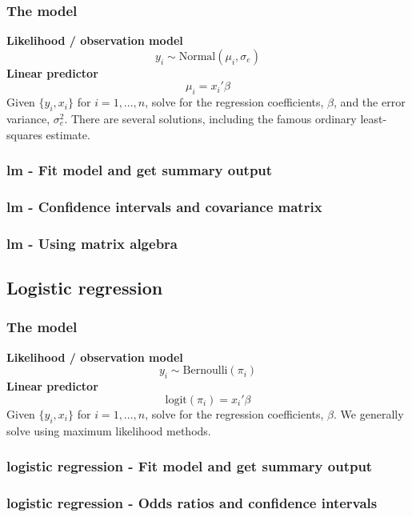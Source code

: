 \documentclass{beamer}
\begin{document}
\begin{frame}
    \frametitle{The model}
    \textbf{Likelihood / observation model}
    \[y_i \sim \text{Normal}(\mu_i, \sigma_e)\]
    \textbf{Linear predictor}
    \[\mu_i = x_i' \beta\]
    \bigskip
    Given $\{y_i, x_i\}$ for $i=1,...,n$, solve for the regression coefficients, $\beta$,
    and the error variance, $\sigma_e^2$.
    \bigskip
    There are several solutions, including the famous ordinary least-squares estimate.
\end{frame}


\begin{frame}[fragile]
    \frametitle{lm - Fit model and get summary output}
    \fontsize{8}{10}\selectfont
    
\end{frame}


\begin{frame}[fragile]
    \frametitle{lm - Confidence intervals and covariance matrix}
    \fontsize{9}{11}\selectfont
    
\end{frame}


\begin{frame}[fragile]
    \frametitle{lm - Using matrix algebra}
    \fontsize{9}{11}\selectfont
    
\end{frame}


\subsection{Logistic regression}

\begin{frame}
    \frametitle{The model}
    \textbf{Likelihood / observation model}
    \[y_i \sim \text{Bernoulli}(\pi_i)\]
    \textbf{Linear predictor}
    \[\text{logit}(\pi_i) = x_i' \beta\]
    \bigskip
    Given $\{y_i, x_i\}$ for $i=1,...,n$, solve for the regression coefficients, $\beta$.
    \bigskip
    We generally solve using maximum likelihood methods.
\end{frame}


\begin{frame}[fragile]
    \frametitle{logistic regression - Fit model and get summary output}
    \fontsize{8}{10}\selectfont
    
\end{frame}


\begin{frame}[fragile]
    \frametitle{logistic regression - Odds ratios and confidence intervals}
    \fontsize{9}{11}\selectfont
    
\end{frame}
\end{document}
